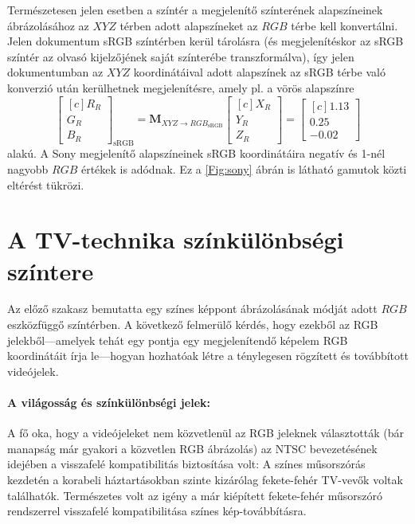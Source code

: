 Természetesen jelen esetben a színtér a megjelenítő színterének alapszíneinek ábrázolásához az $XYZ$ térben adott alapszíneket az $RGB$ térbe kell konvertálni.
Jelen dokumentum sRGB színtérben kerül tárolásra (és megjelenítéskor az sRGB színtér az olvasó kijelzőjének saját színterébe transzformálva), így jelen dokumentumban az $XYZ$ koordinátáival adott alapszínek az sRGB térbe való konverzió után kerülhetnek megjelenítésre, amely pl. a vörös alapszínre
\begin{equation}
\begin{bmatrix}[c]
       R_R \\[0.3em]
       G_R \\[0.3em]
       B_R \end{bmatrix}_{\mathrm{sRGB}}
       =
     \mathbf{M}_{X\!Y\!Z \rightarrow R\!G\!B_{\mathrm{sRGB}}}
      \begin{bmatrix}[c]
       X_R \\[0.3em]
       Y_R \\[0.3em]
       Z_R \end{bmatrix} =      
       \begin{bmatrix}[c]
       1.13 \\[0.3em]
       0.25 \\[0.3em]
       -0.02 \end{bmatrix} 
\end{equation}
alakú.
A Sony megjelenítő alapszíneinek sRGB koordinátáira negatív és 1-nél nagyobb $RGB$ értékek is adódnak.
Ez a \ref{Fig:sony} ábrán is látható gamutok közti eltérést tükrözi.

\section{A TV-technika színkülönbségi színtere}

Az előző szakasz bemutatta egy színes képpont ábrázolásának módját adott $RGB$ eszközfüggő színtérben.
A következő felmerülő kérdés, hogy ezekből az RGB jelekből---amelyek tehát egy pontja egy megjelenítendő képelem RGB koordinátáit írja le---hogyan hozhatóak létre a ténylegesen rögzített és továbbított videójelek.

\paragraph{A világosság és színkülönbségi jelek:\\}
A fő oka, hogy a videójeleket nem közvetlenül az RGB jeleknek választották (bár manapság már gyakori a közvetlen RGB ábrázolás) az NTSC bevezetésének idejében a visszafelé kompatibilitás biztosítása volt:
A színes műsorszórás kezdetén a korabeli háztartásokban szinte kizárólag fekete-fehér TV-vevők voltak találhatók.
Természetes volt az igény a már kiépített fekete-fehér műsorszóró rendszerrel visszafelé kompatibilitása színes kép-továbbításra.

